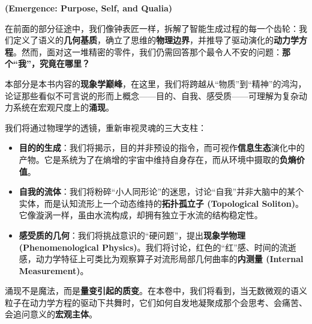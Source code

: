 \label{part:emergence}

\textbf{(Emergence: Purpose, Self, and Qualia)}


在前面的部分征途中，我们像钟表匠一样，拆解了智能生成过程的每一个齿轮：我们定义了语义的\textbf{几何基质}，确立了思维的\textbf{物理边界}，并推导了驱动演化的\textbf{动力学方程}。然而，面对这一堆精密的零件，我们仍需回答那个最令人不安的问题：\textbf{那个“我”，究竟在哪里？}

本部分是本书内容的\textbf{现象学巅峰}，在这里，我们将跨越从“物质”到“精神”的鸿沟，论证那些看似不可言说的形而上概念——目的、自我、感受质——可理解为复杂动力系统在宏观尺度上的\textbf{涌现}。

我们将通过物理学的透镜，重新审视灵魂的三大支柱：
\begin{itemize}
    \item \textbf{目的的生成}：我们将揭示，目的并非预设的指令，而可视作\textbf{信息生态}演化中的产物。它是系统为了在熵增的宇宙中维持自身存在，而从环境中摄取的\textbf{负熵价值}。
    \item \textbf{自我的流体}：我们将粉碎“小人同形论”的迷思，讨论“自我”并非大脑中的某个实体，而是认知流形上一个动态维持的\textbf{拓扑孤立子 (Topological Soliton)}。它像漩涡一样，虽由水流构成，却拥有独立于水流的结构稳定性。
    \item \textbf{感受质的几何}：我们将挑战意识的“硬问题”，提出\textbf{现象学物理 (Phenomenological Physics)}。我们将讨论，红色的“红”感、时间的流逝感，动力学特征上可类比为观察算子对流形局部几何曲率的\textbf{内测量 (Internal Measurement)}。
\end{itemize}

涌现不是魔法，而是\textbf{量变引起的质变}。在本卷中，我们将看到，当无数微观的语义粒子在动力学方程的驱动下共舞时，它们如何自发地凝聚成那个会思考、会痛苦、会追问意义的\textbf{宏观主体}。

\textbf{}


